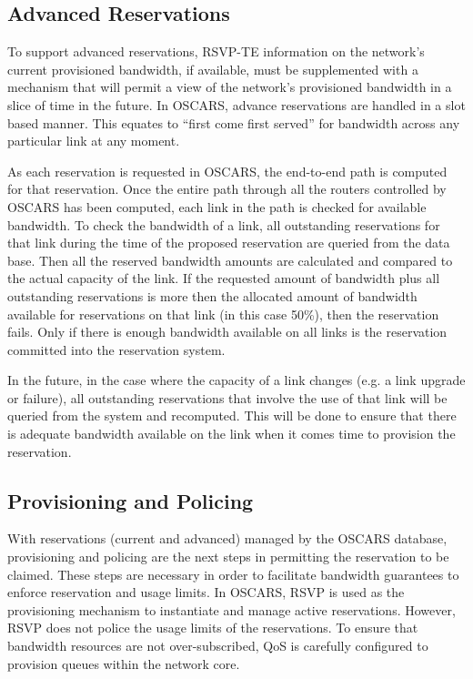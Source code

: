 \documentclass[conference]{IEEEtran}
\begin{document}
\subsection{Advanced Reservations }
To support advanced reservations, RSVP-TE \cite{RSVP-TE} information on the 
network's current
provisioned bandwidth, if available, must be supplemented with a mechanism 
that will permit a view of the network's provisioned bandwidth in a slice of
time in the future.  In OSCARS, advance reservations are handled in a slot 
based manner.  This equates to ``first come first served'' for bandwidth across
any particular link at any moment.

As each reservation is requested in OSCARS, the end-to-end path is
computed for that reservation. Once the entire path through all the routers
controlled by OSCARS has been computed, each link in the path is checked for
available bandwidth. To check the bandwidth of a link, all outstanding
reservations for that link during the time of the proposed reservation are
queried from the data base. Then all the reserved bandwidth amounts are
calculated and compared to the actual capacity of the link. If the requested
amount of bandwidth plus all outstanding reservations is more then the 
allocated amount of bandwidth available for reservations on that link (in 
this case 50\%), then the reservation fails. Only if there is enough bandwidth 
available on all links is the reservation committed into the reservation 
system.

In the future, in the case where the capacity of a link changes (e.g. a link 
upgrade or failure), all outstanding reservations
that involve the use of that link will be queried from the system and 
recomputed.
This will be done to ensure that there is adequate bandwidth available on the
link when it comes time to provision the reservation.

\subsection{Provisioning and Policing}
With reservations (current and advanced) managed by the OSCARS database, 
provisioning and policing are the next steps in permitting the reservation to
be claimed. These steps are necessary in order to facilitate bandwidth 
guarantees to enforce reservation and usage limits.  In OSCARS, RSVP is used 
as the provisioning mechanism to instantiate and manage active reservations. 
However, RSVP does not police the usage limits of the reservations.  To
ensure that bandwidth resources are not over-subscribed, QoS is carefully 
configured to provision queues within the network core.
\end{document}
